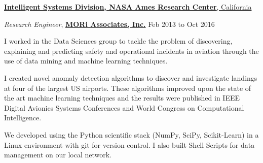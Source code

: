 \documentclass[10pt]{article}
\newenvironment{outerlist}[1][\enskip$\circ$]%
        {\begin{itemize}[#1]}{\end{itemize}%
         \vspace{-.6\baselineskip}}
\newenvironment{innerlist}[1][\enskip$\circ$]%
        {\begin{compactitem}[#1]}{\end{compactitem}}
\begin{document}
\href{http://ti.arc.nasa.gov/}{\textbf{Intelligent Systems Division, NASA Ames Research Center}, California}
\begin{outerlist}
\item[] \textit{Research Engineer}, \href{http://www.moriassociates.com/}{\textbf{MORi Associates, Inc.}} %
\hfill{Feb 2013 to Oct 2016}

  \begin{innerlist}
    \item I worked in the Data Sciences group to tackle the problem of discovering, explaining and predicting safety and operational incidents in aviation through the use of data mining and machine learning techniques.
    \item I created novel anomaly detection algorithms to discover and investigate landings at four of the largest US airports. These algorithms improved upon the state of the art machine learning techniques and the results were published in {\sc IEEE Digital Avionics Systems Conferences} and { World Congress on Computational Intelligence}.
    \item We developed using the {\sc Python} scientific stack ({\sc NumPy, SciPy, Scikit-Learn}) in a  {\sc Linux} environment with {\sc git} for version control. I also built {\sc Shell Scripts} for data management on our local network.

\end{innerlist}
\end{outerlist}
\end{document}
